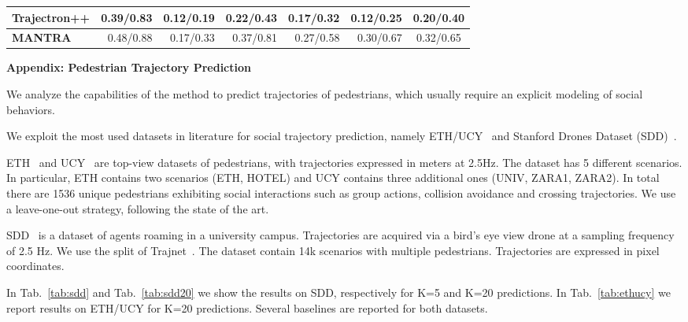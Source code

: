 \documentclass[10pt,twocolumn,letterpaper]{article}
\begin{document}
\begin{table*}[htb!]
\begin{tabular}{l|r|r|r|r|r|c}
		Trajectron++ \cite{salzmann2020trajectron++}                           & \textbf{0.39}/\textbf{0.83}                      & \textbf{0.12}/\textbf{0.19}                & \textbf{0.22}/\textbf{0.43}                & \textbf{0.17}/\textbf{0.32}                & \textbf{0.12}/\textbf{0.25} & \textbf{0.20}/\textbf{0.40}                \\ \hline
		\textbf{MANTRA}                                  & 0.48/0.88                      & 0.17/0.33                 & 0.37/0.81                & 0.27/0.58                 & 0.30/0.67  &  0.32/0.65               \\ \end{tabular}
	\caption{
		\label{tab:ethucy}Results on the ETH/UCY datasets. Each model generates K=20 multiple predictions. Errors are expressed in meters.}

\end{table*}

\FloatBarrier


{\large \textbf{Appendix: Pedestrian Trajectory Prediction}} \medskip

We analyze the capabilities of the method to predict trajectories of pedestrians, which usually require an explicit modeling of social behaviors.

We exploit the most used datasets in literature for social trajectory prediction, namely ETH/UCY~\cite{pellegrini2010eth, lerner2007ucy} and Stanford Drones Dataset (SDD)~\cite{Robicquet2016sdd}.

ETH~\cite{pellegrini2010eth} and UCY~\cite{lerner2007ucy} are top-view datasets of pedestrians, with trajectories expressed in meters at 2.5Hz. The dataset has 5 different scenarios. In particular, ETH contains two scenarios (ETH, HOTEL) and UCY contains three additional ones (UNIV, ZARA1, ZARA2). In total there are 1536 unique pedestrians exhibiting social interactions such as group actions, collision avoidance and crossing trajectories.
We use a leave-one-out strategy, following the state of the art.

SDD~\cite{Robicquet2016sdd} is a dataset of agents roaming in a university campus. Trajectories are acquired via a bird's eye view drone at a sampling frequency of 2.5 Hz.
We use the split of Trajnet~\cite{sadeghian2018trajnet}. The dataset contain 14k scenarios with multiple pedestrians. Trajectories are expressed in pixel coordinates.

In Tab.~\ref{tab:sdd} and Tab.~\ref{tab:sdd20} we show the results on SDD, respectively for K=5 and K=20 predictions.
In Tab.~\ref{tab:ethucy} we report results on ETH/UCY for K=20 predictions.
Several baselines are reported for both datasets.
\end{document}
